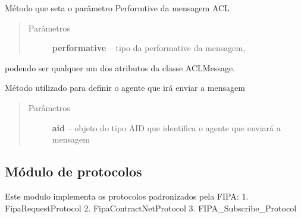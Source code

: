 \documentclass[letterpaper,10pt,brazil]{sphinxmanual}
\begin{document}
\begin{fulllineitems}
\begin{fulllineitems}
\end{fulllineitems}


\begin{fulllineitems}
\label{api:pade.acl.messages.ACLMessage.set_performative}
Método que seta o parâmetro Performtive da mensagem ACL
\begin{quote}\begin{description}
\item[{Parâmetros}] \leavevmode
\textbf{performative} -- tipo da performative da mensagem,

\end{description}\end{quote}

podendo ser qualquer um dos atributos da classe
ACLMessage.

\end{fulllineitems}


\begin{fulllineitems}
\label{api:pade.acl.messages.ACLMessage.set_sender}
Método utilizado para definir o agente que irá enviar a mensagem
\begin{quote}\begin{description}
\item[{Parâmetros}] \leavevmode
\textbf{aid} -- objeto do tipo AID que identifica o agente que enviará a mensagem

\end{description}\end{quote}

\end{fulllineitems}


\end{fulllineitems}

\label{api:module-pade.behaviours.protocols}

\subsection{Módulo de protocolos}
\label{api:modulo-de-protocolos}
Este modulo implementa os protocolos padronizados pela FIPA:
1. FipaRequestProtocol
2. FipaContractNetProtocol
3. FIPA\_Subscribe\_Protocol
\end{document}
